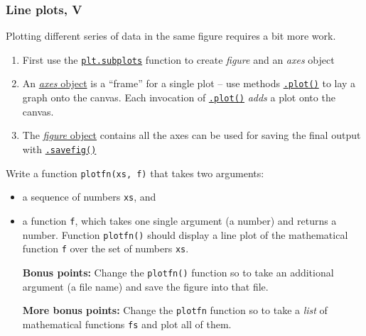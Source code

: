 \documentclass[english,serif,mathserif,xcolor=pdftex,dvipsnames,table]{beamer}
\begin{document}
\begin{frame}
  \frametitle{Line plots, V}
  Plotting different series of data in the same figure requires a bit more work.

  \begin{enumerate}
  \item
    First use the
    \href{http://matplotlib.org/api/pyplot_api.html\#matplotlib.pyplot.subplots}{\texttt{plt.subplots}}
    function to create \emph{figure} and an \emph{axes} object
  \item
    An
    \href{http://matplotlib.org/api/axes_api.html\#matplotlib.axes.Axes}{\emph{axes}
      object} is a ``frame'' for a single plot -- use methods
    \href{http://matplotlib.org/api/_as_gen/matplotlib.axes.Axes.plot.html\#matplotlib.axes.Axes.plot}{\texttt{.plot()}}
    to lay a graph onto the canvas. Each invocation of
    \href{http://matplotlib.org/api/_as_gen/matplotlib.axes.Axes.plot.html\#matplotlib.axes.Axes.plot}{\texttt{.plot()}}
    \emph{adds} a plot onto the canvas.
  \item
    The
    \href{http://matplotlib.org/api/figure_api.html\#matplotlib.figure.Figure}{\emph{figure}
      object} contains all the axes can be used for saving the final output
    with
    \href{http://matplotlib.org/api/figure_api.html\#matplotlib.figure.Figure.savefig}{\texttt{.savefig()}}
\end{enumerate}
\end{frame}


\begin{frame}
  \begin{exercise*}

    Write a function \texttt{plotfn(xs, f)} that takes two arguments:
    \begin{itemize}
    \item a sequence of numbers \texttt{xs}, and
    \item a function \texttt{f}, which takes one single argument (a number) and
      returns a number.
    Function \texttt{plotfn()} should display a line plot of the mathematical
    function \texttt{f} over the set of numbers \texttt{xs}.

    \+ \textbf{Bonus points:} Change the \texttt{plotfn()} function so to take
    an additional argument (a file name) and save the figure into that file.

    \+ \textbf{More bonus points:} Change the \texttt{plotfn} function so to
    take a \emph{list} of mathematical functions \texttt{fs} and plot all of them.
    \end{itemize}
  \end{exercise*}
\end{frame}
\end{document}
